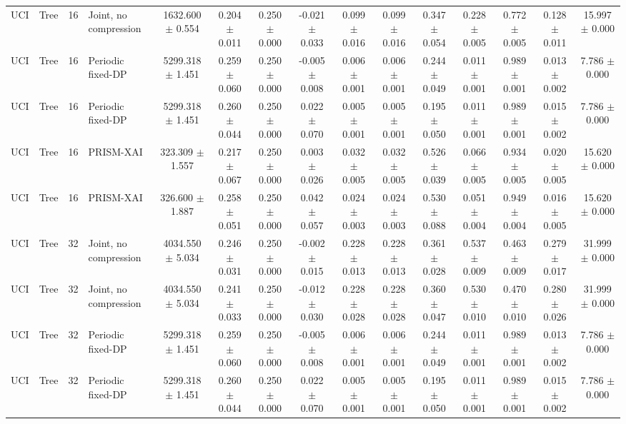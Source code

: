 \begin{table}[t]
\begin{tabular}{llllccccccccccc}
UCI & Tree & 16 & Joint, no compression & 1632.600 $\pm$ 0.554 & 0.204 $\pm$ 0.011 & 0.250 $\pm$ 0.000 & -0.021 $\pm$ 0.033 & 0.099 $\pm$ 0.016 & 0.099 $\pm$ 0.016 & 0.347 $\pm$ 0.054 & 0.228 $\pm$ 0.005 & 0.772 $\pm$ 0.005 & 0.128 $\pm$ 0.011 & 15.997 $\pm$ 0.000 \\
UCI & Tree & 16 & Periodic fixed-DP & 5299.318 $\pm$ 1.451 & 0.259 $\pm$ 0.060 & 0.250 $\pm$ 0.000 & -0.005 $\pm$ 0.008 & 0.006 $\pm$ 0.001 & 0.006 $\pm$ 0.001 & 0.244 $\pm$ 0.049 & 0.011 $\pm$ 0.001 & 0.989 $\pm$ 0.001 & 0.013 $\pm$ 0.002 & 7.786 $\pm$ 0.000 \\
UCI & Tree & 16 & Periodic fixed-DP & 5299.318 $\pm$ 1.451 & 0.260 $\pm$ 0.044 & 0.250 $\pm$ 0.000 & 0.022 $\pm$ 0.070 & 0.005 $\pm$ 0.001 & 0.005 $\pm$ 0.001 & 0.195 $\pm$ 0.050 & 0.011 $\pm$ 0.001 & 0.989 $\pm$ 0.001 & 0.015 $\pm$ 0.002 & 7.786 $\pm$ 0.000 \\
UCI & Tree & 16 & PRISM-XAI & 323.309 $\pm$ 1.557 & 0.217 $\pm$ 0.067 & 0.250 $\pm$ 0.000 & 0.003 $\pm$ 0.026 & 0.032 $\pm$ 0.005 & 0.032 $\pm$ 0.005 & 0.526 $\pm$ 0.039 & 0.066 $\pm$ 0.005 & 0.934 $\pm$ 0.005 & 0.020 $\pm$ 0.005 & 15.620 $\pm$ 0.000 \\
UCI & Tree & 16 & PRISM-XAI & 326.600 $\pm$ 1.887 & 0.258 $\pm$ 0.051 & 0.250 $\pm$ 0.000 & 0.042 $\pm$ 0.057 & 0.024 $\pm$ 0.003 & 0.024 $\pm$ 0.003 & 0.530 $\pm$ 0.088 & 0.051 $\pm$ 0.004 & 0.949 $\pm$ 0.004 & 0.016 $\pm$ 0.005 & 15.620 $\pm$ 0.000 \\
UCI & Tree & 32 & Joint, no compression & 4034.550 $\pm$ 5.034 & 0.246 $\pm$ 0.031 & 0.250 $\pm$ 0.000 & -0.002 $\pm$ 0.015 & 0.228 $\pm$ 0.013 & 0.228 $\pm$ 0.013 & 0.361 $\pm$ 0.028 & 0.537 $\pm$ 0.009 & 0.463 $\pm$ 0.009 & 0.279 $\pm$ 0.017 & 31.999 $\pm$ 0.000 \\
UCI & Tree & 32 & Joint, no compression & 4034.550 $\pm$ 5.034 & 0.241 $\pm$ 0.033 & 0.250 $\pm$ 0.000 & -0.012 $\pm$ 0.030 & 0.228 $\pm$ 0.028 & 0.228 $\pm$ 0.028 & 0.360 $\pm$ 0.047 & 0.530 $\pm$ 0.010 & 0.470 $\pm$ 0.010 & 0.280 $\pm$ 0.026 & 31.999 $\pm$ 0.000 \\
UCI & Tree & 32 & Periodic fixed-DP & 5299.318 $\pm$ 1.451 & 0.259 $\pm$ 0.060 & 0.250 $\pm$ 0.000 & -0.005 $\pm$ 0.008 & 0.006 $\pm$ 0.001 & 0.006 $\pm$ 0.001 & 0.244 $\pm$ 0.049 & 0.011 $\pm$ 0.001 & 0.989 $\pm$ 0.001 & 0.013 $\pm$ 0.002 & 7.786 $\pm$ 0.000 \\
UCI & Tree & 32 & Periodic fixed-DP & 5299.318 $\pm$ 1.451 & 0.260 $\pm$ 0.044 & 0.250 $\pm$ 0.000 & 0.022 $\pm$ 0.070 & 0.005 $\pm$ 0.001 & 0.005 $\pm$ 0.001 & 0.195 $\pm$ 0.050 & 0.011 $\pm$ 0.001 & 0.989 $\pm$ 0.001 & 0.015 $\pm$ 0.002 & 7.786 $\pm$ 0.000 \\

\end{tabular}
\end{table}
